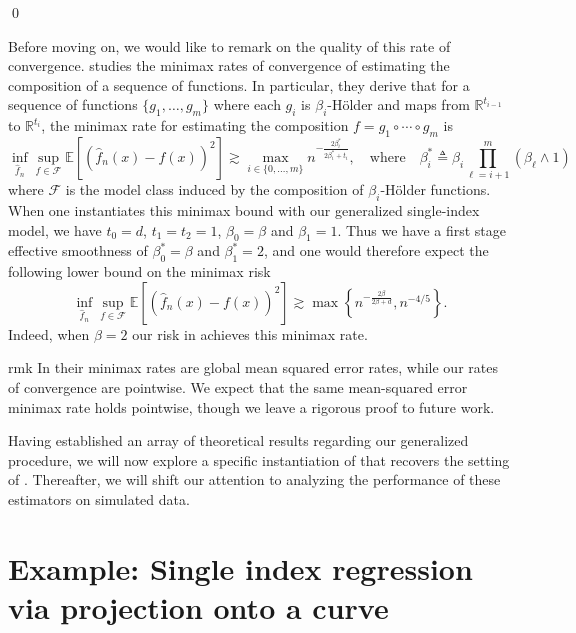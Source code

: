 \documentclass[11pt]{article}
\begin{document}
\qed{}

Before moving on, we would like to remark on the quality of this rate of convergence. \citet{Schmidt_Hieber_2020} studies the minimax rates of convergence of estimating the composition of a sequence of functions. In particular, they derive that for a sequence of functions $\{g_1, \dots, g_m\}$ where each $g_i$ is $\beta_i$-H\"older and maps from $\mathbb{R}^{t_{i-1}}$ to $\mathbb{R}^{t_i}$, the minimax rate for estimating the composition $f = g_1 \circ \cdots \circ g_m$ is
\[ \inf_{\hat f_n } \sup_{f\in \mathcal{F}}  \mathbb{E}\left[(\hat f_n(x) - f(x))^2\right] \gtrsim \max_{i \in \{0, \dots, m\}} n^{-\frac{2\beta_i^*}{2\beta_i^* + t_i}}, \quad \text{where} \quad  \beta_i^* \triangleq \beta_i \prod_{\ell = i+1}^m(\beta_\ell \wedge 1)\]
where $\mathcal{F}$ is the model class induced by the composition of $\beta_i$-H\"older functions. When one instantiates this minimax bound with our generalized single-index model, we have $t_0 = d$, $t_1 = t_2 = 1$, $\beta_0 = \beta$ and $\beta_1 = 1$. Thus we have a first stage effective smoothness of $\beta_0^* = \beta$ and $\beta_1^* = 2$, and one would therefore expect the following lower bound on the minimax risk
\[\inf_{\hat f_n } \sup_{f\in \mathcal{F}}  \mathbb{E}\left[(\hat f_n(x) - f(x))^2\right] \gtrsim \max\left\{n^{-\frac{2\beta}{2\beta + d}}, n^{-4/5}\right\}.\]
Indeed, when $\beta = 2$ our risk in  achieves this minimax rate. 
\begin{restatable}{rmk}{}
    In \citet{Schmidt_Hieber_2020} their minimax rates are global mean squared error rates, while our rates of convergence are pointwise. We expect that the same mean-squared error minimax rate holds pointwise, though we leave a rigorous proof to future work.
\end{restatable}

Having established an array of theoretical results regarding our generalized procedure, we will now explore a specific instantiation of that recovers the setting of \citet{wu2024conditional}. Thereafter, we will shift our attention to analyzing the performance of these estimators on simulated data. 

\section{Example: Single index regression via projection onto a curve}
\end{document}
